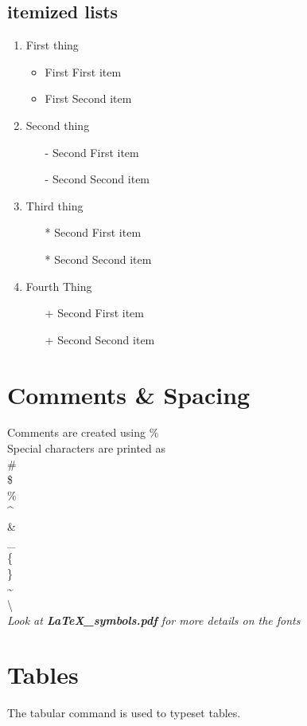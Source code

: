 \documentclass[a4paper, 12pt]{article}
\begin{document}
\subsection{itemized lists}
\begin{enumerate}
\item First thing
\begin{itemize}
\item First First item
\item First Second item
\end{itemize}
\item Second thing
\begin{itemize}
\item[-] Second First item
\item[-] Second Second item
\end{itemize}
\item Third thing
\begin{itemize}
\item[*] Second First item
\item[*] Second Second item
\end{itemize}
\item Fourth Thing
\begin{itemize}
\item[+] Second First item
\item[+] Second Second item
\end{itemize}
\end{enumerate}

\section{Comments \& Spacing}
Comments are created using \% \\

Special characters are printed as \\
\# \\
\$ \\
\% \\
\^{} \\
\& \\
\_ \\
\{ \\
\} \\
\~{} \\
\textbackslash \\

\textit{Look at \textbf{LaTeX\_symbols.pdf} for more details on the fonts}

\section{Tables}
The \textsf{tabular} command is used to typeset tables.\\
\end{document}
